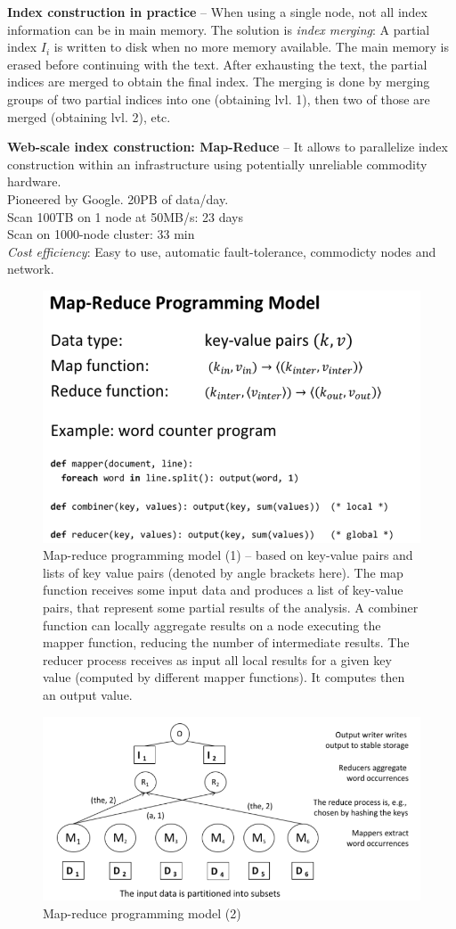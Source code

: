    \textbf{Index construction in practice} -- When using a single node, not all index information can be in main memory. The solution is \emph{index merging}: A partial index $I_i$ is written to disk when no more memory available. The main memory is erased before continuing with the text. After exhausting the text, the partial indices are merged to obtain the final index. The merging is done by merging groups of two partial indices into one (obtaining lvl. 1), then two of those are merged (obtaining lvl. 2), etc.

    \textbf{Web-scale index construction: Map-Reduce} --  It allows to parallelize index construction within an infrastructure using potentially unreliable commodity hardware.\\
    Pioneered by Google. 20PB of data/day.\\
    Scan 100TB on 1 node at 50MB/s: 23 days\\
    Scan on 1000-node cluster: 33 min\\
    \emph{Cost efficiency}: Easy to use, automatic fault-tolerance, commodicty nodes and network.

    \begin{figure}[htp]
      \centering
        \includegraphics[width=.65\textwidth]{images/Mapreduce1.png}
        \caption{Map-reduce programming model (1) -- based on key-value pairs and lists of key value pairs (denoted by angle brackets here). The map function receives some input data and produces a list of key-value pairs, that represent some partial results of the analysis. A combiner function can locally aggregate results on a node executing the mapper function, reducing the number of intermediate results. The reducer process receives as input all local results for a given key value (computed by different mapper functions). It computes then an output value.}
        \label{fig:Mapreduce1}
    \end{figure}

    \begin{figure}[htp]
      \centering
        \includegraphics[width=.65\textwidth]{images/Mapreduce2.png}
        \caption{Map-reduce programming model (2)}
        \label{fig:Mapreduce2}
    \end{figure}

